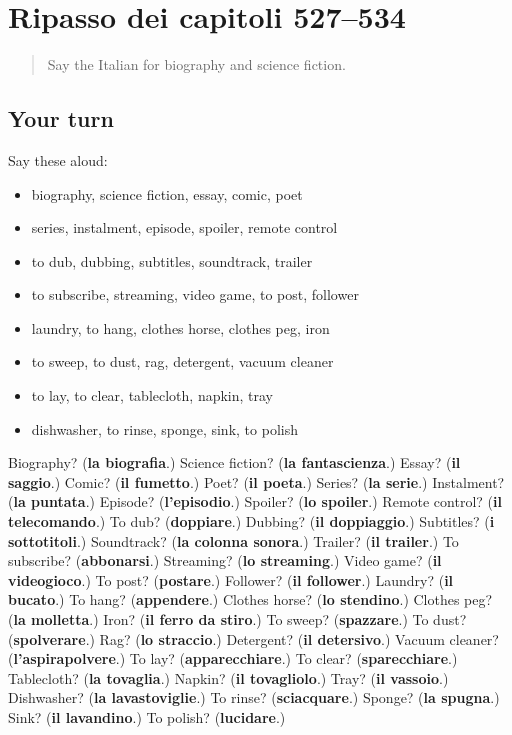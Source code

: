 \section[(dialogue)]{Ripasso dei capitoli 527–534}

\label{lesson:IT-R534-ripasso-527-534}



\begin{quote}
Say the Italian for biography and science fiction.
\end{quote}

\subsection*{Your turn}
Say these aloud:

\begin{itemize}
\raggedright
  \item biography, science fiction, essay, comic, poet
  \item series, instalment, episode, spoiler, remote control
  \item to dub, dubbing, subtitles, soundtrack, trailer
  \item to subscribe, streaming, video game, to post, follower
  \item laundry, to hang, clothes horse, clothes peg, iron
  \item to sweep, to dust, rag, detergent, vacuum cleaner
  \item to lay, to clear, tablecloth, napkin, tray
  \item dishwasher, to rinse, sponge, sink, to polish
\end{itemize}

\begin{tcolorbox}[breakable,colback=teal!4,colframe=teal!35!black,title={Before you move on}]
Biography? (\textbf{la biografia}.) Science fiction? (\textbf{la fantascienza}.) Essay? (\textbf{il saggio}.) Comic? (\textbf{il fumetto}.) Poet? (\textbf{il poeta}.) Series? (\textbf{la serie}.) Instalment? (\textbf{la puntata}.) Episode? (\textbf{l'episodio}.) Spoiler? (\textbf{lo spoiler}.) Remote control? (\textbf{il telecomando}.) To dub? (\textbf{doppiare}.) Dubbing? (\textbf{il doppiaggio}.) Subtitles? (\textbf{i sottotitoli}.) Soundtrack? (\textbf{la colonna sonora}.) Trailer? (\textbf{il trailer}.) To subscribe? (\textbf{abbonarsi}.) Streaming? (\textbf{lo streaming}.) Video game? (\textbf{il videogioco}.) To post? (\textbf{postare}.) Follower? (\textbf{il follower}.) Laundry? (\textbf{il bucato}.) To hang? (\textbf{appendere}.) Clothes horse? (\textbf{lo stendino}.) Clothes peg? (\textbf{la molletta}.) Iron? (\textbf{il ferro da stiro}.) To sweep? (\textbf{spazzare}.) To dust? (\textbf{spolverare}.) Rag? (\textbf{lo straccio}.) Detergent? (\textbf{il detersivo}.) Vacuum cleaner? (\textbf{l'aspirapolvere}.) To lay? (\textbf{apparecchiare}.) To clear? (\textbf{sparecchiare}.) Tablecloth? (\textbf{la tovaglia}.) Napkin? (\textbf{il tovagliolo}.) Tray? (\textbf{il vassoio}.) Dishwasher? (\textbf{la lavastoviglie}.) To rinse? (\textbf{sciacquare}.) Sponge? (\textbf{la spugna}.) Sink? (\textbf{il lavandino}.) To polish? (\textbf{lucidare}.)
\end{tcolorbox}

